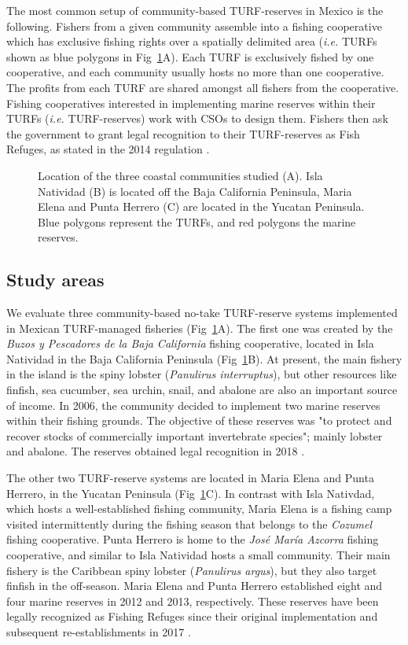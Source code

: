 \documentclass[10pt,letterpaper]{article}
\begin{document}
The most common setup of community-based TURF-reserves in Mexico is the following. Fishers from a given community assemble into a fishing cooperative which has exclusive fishing rights over a spatially delimited area (\emph{i.e.} TURFs shown as blue polygons in Fig~\ref{fig:map}A). Each TURF is exclusively fished by one cooperative, and each community usually hosts no more than one cooperative. The profits from each TURF are shared amongst all fishers from the cooperative. Fishing cooperatives interested in implementing marine reserves within their TURFs (\emph{i.e.} TURF-reserves) work with CSOs to design them. Fishers then ask the government to grant legal recognition to their TURF-reserves as Fish Refuges, as stated in the 2014 regulation \cite{nom}.

\begin{figure}[!h]
\centering
\caption{Location of the three coastal communities studied (A). Isla Natividad (B) is located off the Baja California Peninsula, Maria Elena and Punta Herrero (C) are located in the Yucatan Peninsula. Blue polygons represent the TURFs, and red polygons the marine reserves.}
\label{fig:map}
\end{figure}

\subsection*{Study areas}

We evaluate three community-based no-take TURF-reserve systems implemented in Mexican TURF-managed fisheries (Fig~\ref{fig:map}A). The first one was created by the \emph{Buzos y Pescadores de la Baja California} fishing cooperative, located in Isla Natividad in the Baja California Peninsula (Fig~\ref{fig:map}B). At present, the main fishery in the island is the spiny lobster (\emph{Panulirus interruptus}), but other resources like finfish, sea cucumber, sea urchin, snail, and abalone are also an important source of income. In 2006, the community decided to implement two marine reserves within their fishing grounds. The objective of these reserves was "to protect and recover stocks of commercially important invertebrate species"; mainly lobster and abalone. The reserves obtained legal recognition in 2018 \cite{dof_website_2018}.

The other two TURF-reserve systems are located in Maria Elena and Punta Herrero, in the Yucatan Peninsula (Fig~\ref{fig:map}C). In contrast with Isla Nativdad, which hosts a well-established fishing community, Maria Elena is a fishing camp visited intermittently during the fishing season that belongs to the \emph{Cozumel} fishing cooperative. Punta Herrero is home to the \emph{José María Azcorra} fishing cooperative, and similar to Isla Natividad hosts a small community. Their main fishery is the Caribbean spiny lobster (\emph{Panulirus argus}), but they also target finfish in the off-season. Maria Elena and Punta Herrero established eight and four marine reserves in 2012 and 2013, respectively. These reserves have been legally recognized as Fishing Refuges since their original implementation \cite{dof_website_2012,dof_website_2013} and subsequent re-establishments in 2017 \cite{dof_website_2017b}.
\end{document}

